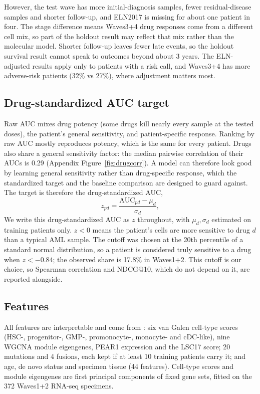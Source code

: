 \documentclass[11pt,logo,nonumbering]{preprint}
\newcommand{\z}{z}
\begin{document}
However, the test wave has more initial-diagnosis samples, fewer residual-disease samples and shorter follow-up, and ELN2017 is missing for about one patient in four. The stage difference means Waves3+4 drug responses come from a different cell mix, so part of the holdout result may reflect that mix rather than the molecular model. Shorter follow-up leaves fewer late events, so the holdout survival result cannot speak to outcomes beyond about 3 years. The ELN-adjusted results apply only to patients with a risk call, and Waves3+4 has more adverse-risk patients (32\% vs 27\%), where adjustment matters most.



\subsection{Drug-standardized AUC target}
Raw AUC mixes drug potency (some drugs kill nearly every sample at the tested doses), the patient's general sensitivity, and patient-specific response. Ranking by raw AUC mostly reproduces potency, which is the same for every patient. Drugs also share a general sensitivity factor: the median pairwise correlation of their AUCs is 0.29 (Appendix Figure~\ref{fig:drugcorr}). A model can therefore look good by learning general sensitivity rather than drug-specific response, which the standardized target and the baseline comparison are designed to guard against. The target is therefore the drug-standardized AUC,
\begin{equation}
 \z_{pd}=\frac{\mathrm{AUC}_{pd}-\mu_d}{\sigma_d},
\end{equation}
We write this drug-standardized AUC as $\z$ throughout, with $\mu_d,\sigma_d$ estimated on training patients only. $\z<0$ means the patient's cells are more sensitive to drug $d$ than a typical AML sample. The cutoff was chosen at the 20th percentile of a standard normal distribution, so a patient is considered truly sensitive to a drug when $\z<-0.84$; the observed share is 17.8\% in Waves1+2. This cutoff is our choice, so Spearman correlation and NDCG@10, which do not depend on it, are reported alongside.

\subsection{Features}
All features are interpretable and come from \citet{bottomly2022}: six van Galen cell-type scores \citep{vangalen2019} (HSC-, progenitor-, GMP-, promonocyte-, monocyte- and cDC-like), nine WGCNA module eigengenes, PEAR1 expression and the LSC17 score; 20 mutations and 4 fusions, each kept if at least 10 training patients carry it; and age, de novo status and specimen tissue (44 features). Cell-type scores and module eigengenes are first principal components of fixed gene sets, fitted on the 372 Waves1+2 RNA-seq specimens.
\end{document}
